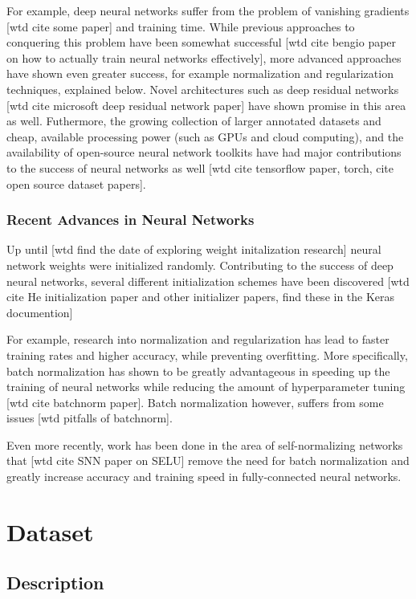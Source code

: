 \documentclass[a4paper,11pt,twoside]{scrbook}
\begin{document}
For example, deep neural networks suffer from the problem of vanishing gradients [wtd cite some paper] and training time.  While previous approaches to conquering this problem have been somewhat successful [wtd cite bengio paper on how to actually train neural networks effectively], more advanced approaches have shown even greater success, for example normalization and regularization techniques, explained below.  Novel architectures such as deep residual networks [wtd cite microsoft deep residual network paper] have shown promise in this area as well.  Futhermore, the growing collection of larger annotated datasets and cheap, available processing power (such as GPUs and cloud computing), and the availability of open-source neural network toolkits have had major contributions to the success of neural networks as well [wtd cite tensorflow paper, torch, cite open source dataset papers].

\subsection{Recent Advances in Neural Networks}

Up until [wtd find the date of exploring weight initalization research] neural network weights were initialized randomly.  Contributing to the success of deep neural networks, several different initialization schemes have been discovered [wtd cite He initialization paper and other initializer papers, find these in the Keras documention]

For example, research into normalization and regularization has lead to faster training rates and higher accuracy, while preventing overfitting.  More specifically, batch normalization has shown to be greatly advantageous in speeding up the training of neural networks while reducing the amount of hyperparameter tuning [wtd cite batchnorm paper].  Batch normalization however, suffers from some issues [wtd pitfalls of batchnorm].

Even more recently, work has been done in the area of self-normalizing networks that [wtd cite SNN paper on SELU] remove the need for batch normalization and greatly increase accuracy and training speed in fully-connected neural networks.
  
\chapter{Dataset}

\section{Description}
\end{document}

